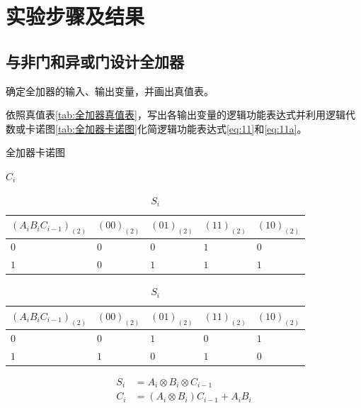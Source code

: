 \documentclass{ctexrep}
\begin{document}
\newpage
\section{实验步骤及结果}%
\label{sec:实验步骤及结果\arabic{chapter}}

\subsection{与非门和异或门设计全加器}%
\label{sub:与非门和异或门设计全加器}

确定全加器的输入、输出变量，并画出真值表。

依照真值表\ref{tab:全加器真值表}，写出各输出变量的逻辑功能表达式并利用逻辑代数或卡诺图\ref{tab:全加器卡诺图}化简逻辑功能表达式\ref{eq:11}和\ref{eq:11a}。

\begin{table}[htbp]
	\centering
	\caption{全加器卡诺图}
	\label{tab:全加器卡诺图}
	\begin{subtable}[htbp]{.45\linewidth}
		\centering
		\caption{$C_i$}
		\label{tab:C}
		\begin{tabu}to
			$(A_iB_iC_{i-1})_{(2)}$& $(00)_{(2)}$ & $(01)_{(2)}$ & $(11)_{(2)}$ & $(10)_{(2)}$ \\
			\hline
			$0$ & $0$ & $0$ & $1$ & $0$ \\
			$1$ & $0$ & $1$ & $1$ & $1$ \\
		\end{tabu}
	\end{subtable}
	\quad
	\begin{subtable}[htbp]{.45\linewidth}
		\centering
		\caption{$S_i$}
		\label{tab:S}
		\begin{tabu}to
			$(A_iB_iC_{i-1})_{(2)}$& $(00)_{(2)}$ & $(01)_{(2)}$ & $(11)_{(2)}$ & $(10)_{(2)}$ \\
			\hline
			$0$ & $0$ & $1$ & $0$ & $1$ \\
			$1$ & $1$ & $0$ & $1$ & $0$ \\
		\end{tabu}
	\end{subtable}
\end{table}

\begin{align}
	\label{eq:11}
	S_i&=A_i\otimes B_i \otimes C_{i-1}
	\\
	\label{eq:11a}
	C_i&=(A_i\otimes B_i)C_{i-1}+A_iB_i
\end{align}
\end{document}
